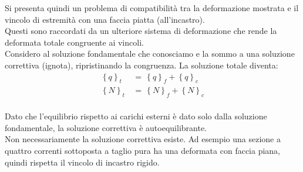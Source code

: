 Si presenta quindi un problema di compatibilità tra la deformazione mostrata e il vincolo di estremità con una faccia piatta (all'incastro).\\
Questi sono raccordati da un ulteriore sistema di deformazione che rende la deformata totale congruente ai vincoli.\\
Considero al soluzione fondamentale che conosciamo e la sommo a una soluzione correttiva (ignota), ripristinando la congruenza. La soluzione totale diventa:
\begin{align*}
    \left\{ q\right\}_t \,&=\,   \left\{ q\right\}_f  +   \left\{ q\right\}_c \\
       \left\{ N\right\}_t \,&=\,   \left\{ N\right\}_f  +   \left\{ N\right\}_c \\
\end{align*}

Dato che  l'equilibrio rispetto ai carichi esterni è dato solo dalla soluzione fondamentale, la soluzione correttiva è autoequilibrante.\\
Non necessariamente la soluzione correttiva esiste. Ad esempio una sezione a quattro correnti sottoposta a taglio pura ha una deformata con faccia piana, quindi rispetta il vincolo di incastro rigido.


